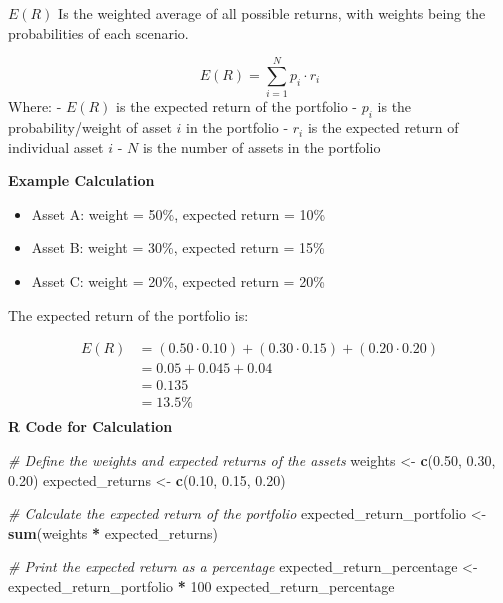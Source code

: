 \documentclass[
]{book}
\newenvironment{Shaded}{\begin{snugshade}}{\end{snugshade}}
\newcommand{\CommentTok}[1]{\textcolor[rgb]{0.56,0.35,0.01}{\textit{#1}}}
\newcommand{\DecValTok}[1]{\textcolor[rgb]{0.00,0.00,0.81}{#1}}
\newcommand{\FloatTok}[1]{\textcolor[rgb]{0.00,0.00,0.81}{#1}}
\newcommand{\FunctionTok}[1]{\textcolor[rgb]{0.13,0.29,0.53}{\textbf{#1}}}
\newcommand{\NormalTok}[1]{#1}
\newcommand{\OtherTok}[1]{\textcolor[rgb]{0.56,0.35,0.01}{#1}}
\newcommand{\SpecialCharTok}[1]{\textcolor[rgb]{0.81,0.36,0.00}{\textbf{#1}}}
\providecommand{\tightlist}{%
  \setlength{\itemsep}{0pt}\setlength{\parskip}{0pt}}
\begin{document}
\(E(R)\) Is the weighted average of all possible returns, with weights being the probabilities of each scenario.

\[
E(R) = \sum_{i=1}^{N} p_i \cdot r_i
\]
Where:
- \(E(R)\) is the expected return of the portfolio
- \(p_i\) is the probability/weight of asset \(i\) in the portfolio
- \(r_i\) is the expected return of individual asset \(i\)
- \(N\) is the number of assets in the portfolio

\textbf{Example Calculation}

\begin{itemize}
\tightlist
\item
  Asset A: weight = 50\%, expected return = 10\%
\item
  Asset B: weight = 30\%, expected return = 15\%
\item
  Asset C: weight = 20\%, expected return = 20\%
\end{itemize}

The expected return of the portfolio is:

\[
\begin{aligned}
E(R) &= (0.50 \cdot 0.10) + (0.30 \cdot 0.15) + (0.20 \cdot 0.20) \\
       &= 0.05 + 0.045 + 0.04 \\
       &= 0.135 \\
       &= 13.5\% \\  
\end{aligned}
\]
\textbf{R Code for Calculation}

\begin{Shaded}
\begin{Highlighting}[]
\CommentTok{\# Define the weights and expected returns of the assets}
\NormalTok{weights }\OtherTok{\textless{}{-}} \FunctionTok{c}\NormalTok{(}\FloatTok{0.50}\NormalTok{, }\FloatTok{0.30}\NormalTok{, }\FloatTok{0.20}\NormalTok{)}
\NormalTok{expected\_returns }\OtherTok{\textless{}{-}} \FunctionTok{c}\NormalTok{(}\FloatTok{0.10}\NormalTok{, }\FloatTok{0.15}\NormalTok{, }\FloatTok{0.20}\NormalTok{)}

\CommentTok{\# Calculate the expected return of the portfolio}
\NormalTok{expected\_return\_portfolio }\OtherTok{\textless{}{-}} \FunctionTok{sum}\NormalTok{(weights }\SpecialCharTok{*}\NormalTok{ expected\_returns)}

\CommentTok{\# Print the expected return as a percentage}
\NormalTok{expected\_return\_percentage }\OtherTok{\textless{}{-}}\NormalTok{ expected\_return\_portfolio }\SpecialCharTok{*} \DecValTok{100}
\NormalTok{expected\_return\_percentage}
\end{Highlighting}
\end{Shaded}
\end{document}
